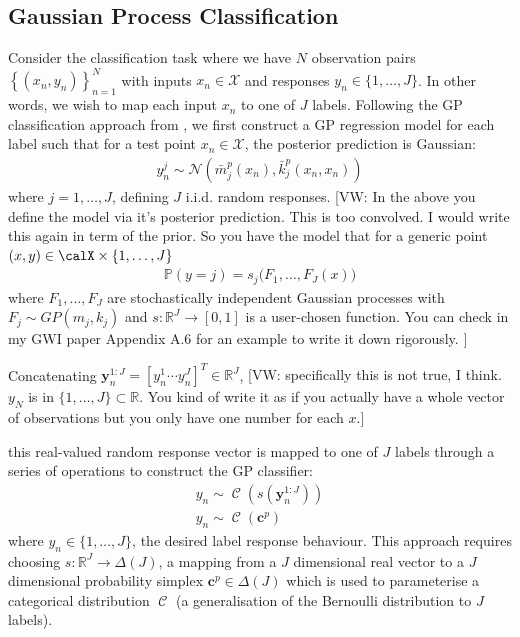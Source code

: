 \documentclass{article}
\newcommand{\vw}[1]{{\color{green} [VW: #1]}}
\newcommand{\Cat}{\operatorname{\mathcal{C}}}
\numberwithin{equation}{section}
\begin{document}
\subsection{Gaussian Process Classification}\label{section:gp-classifiers}
Consider the classification task where we have $N$ observation pairs $\left\{(x_n, y_n)\right\}_{n=1}^{N}$ with inputs $x_n \in \mathcal{X}$ and responses $y_n \in \{1, \dots, J\}$. In other words, we wish to map each input $x_n$ to one of $J$ labels. Following the GP classification approach from \cite{matthews2017scalable}, we first construct a GP regression model for each label such that for a test point $x_n \in \mathcal{X}$, the posterior prediction is Gaussian:
\begin{align}
    y_n^j \sim \mathcal{N}\left(\bar{m}^p_j(x_n), \bar{k}^p_j(x_n, x_n)\right)
    \label{gp-classifier-regressors}
\end{align}
where $j=1, \dots, J$, defining $J$ i.i.d. random responses. \vw{In the above you define the model via it's posterior prediction. This is too convolved. I would write this again in term of the prior. So you have the model that for a generic point $(x,y) \in \calX \times \{1,\hdots, J\}$
\begin{align}
    \mathbb{P}( y = j ) = s_j\big( F_1, \hdots, F_J(x) \big)
\end{align}
where $F_1,\hdots, F_J$ are stochastically independent Gaussian processes with $F_j \sim GP(m_j,k_j)$ and $s:\mathbb{R}^J \to [0,1]$ is a user-chosen function. You can check in my GWI paper Appendix A.6 for an example to write it down rigorously.
}

Concatenating $\mathbf{y}_n^{1:J} = [y_n^1 \cdots y_n^J]^T \in \mathbb{R}^{J}$, \vw{specifically this is not true, I think. $y_N$ is in $\{1, \hdots, J \} \subset \mathbb{R}$. You kind of write it as if you actually have a whole vector of observations but you only have one number for each $x$.}

this real-valued random response vector is mapped to one of $J$ labels through a series of operations to construct the GP classifier:
\begin{align}
\label{gp-classifier}
y_n \sim \Cat \left(s\left(\mathbf{y}_n^{1:J}\right)\right) \\
y_n \sim \Cat \left(\mathbf{c}^p\right)
\label{gp-classifier}
\end{align}
where $y_n \in \{1, \dots, J\}$, the desired label response behaviour. This approach requires choosing $s: \mathbb{R}^J \rightarrow \Delta(J)$, a mapping from a $J$ dimensional real vector to a $J$ dimensional probability simplex $\mathbf{c}^p \in \Delta(J)$ which is used to parameterise a categorical distribution $\Cat$ (a generalisation of the Bernoulli distribution to $J$ labels).
\end{document}
